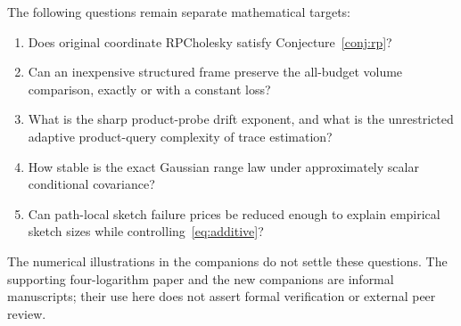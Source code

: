 \documentclass[11pt,a4paper]{article}
\begin{document}
The following questions remain separate mathematical targets:
\begin{enumerate}
\item Does original coordinate RPCholesky satisfy
Conjecture~\ref{conj:rp}?
\item Can an inexpensive structured frame preserve the all-budget volume
comparison, exactly or with a constant loss?
\item What is the sharp product-probe drift exponent, and what is the
unrestricted adaptive product-query complexity of trace estimation?
\item How stable is the exact Gaussian range law under approximately scalar
conditional covariance?
\item Can path-local sketch failure prices be reduced enough to explain
empirical sketch sizes while controlling~\eqref{eq:additive}?
\end{enumerate}
The numerical illustrations in the companions do not settle these
questions. The supporting four-logarithm paper and the new companions are
informal manuscripts; their use here does not assert formal verification
or external peer review.
\end{document}
